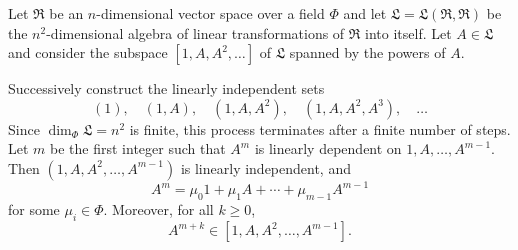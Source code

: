 Let $\mathfrak{R}$ be an $n$-dimensional vector space over a field $\Phi$ and let $\mathfrak{L} = \mathfrak{L}(\mathfrak{R}, \mathfrak{R})$ be the $n^2$-dimensional algebra of linear transformations of $\mathfrak{R}$ into itself. Let $A \in \mathfrak{L}$ and consider the subspace $[1, A, A^2, \dots]$ of $\mathfrak{L}$ spanned by the powers of $A$.

Successively construct the linearly independent sets
$$(1), \quad (1, A), \quad (1, A, A^2), \quad (1, A, A^2, A^3), \quad \dots$$
Since $\dim_\Phi \mathfrak{L} = n^2$ is finite, this process terminates after a finite number of steps. Let $m$ be the first integer such that $A^m$ is linearly dependent on $1, A, \dots, A^{m-1}$. Then $(1, A, A^2, \dots, A^{m-1})$ is linearly independent, and
$$A^m = \mu_0 1 + \mu_1 A + \cdots + \mu_{m-1} A^{m-1}$$
for some $\mu_i \in \Phi$. Moreover, for all $k \ge 0$,
$$A^{m+k} \in [1, A, A^2, \dots, A^{m-1}].$$

